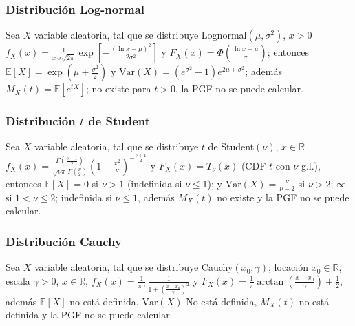 \subsubsection{Distribuci\'on Log-normal}

\begin{Def} Sea $X$ variable aleatoria, tal que se distribuye Lognormal$(\mu,\sigma^{2})$, $x>0$
$f_X(x) = \frac{1}{x\,\sigma\sqrt{2\pi}} \exp\!\left[-\frac{(\ln x-\mu)^{2}}{2\sigma^{2}}\right]$ y $F_X(x) = \Phi\!\left(\frac{\ln x-\mu}{\sigma}\right)$; entonces $\mathbb{E}[X] = \exp\!\left(\mu+\frac{\sigma^{2}}{2}\right)$ y $\mathrm{Var}(X) =\left(e^{\sigma^{2}}-1\right)e^{2\mu+\sigma^{2}}$; adem\'as $M_X(t) = \mathbb{E}[e^{tX}]$; no existe para $t>0$,  la PGF no se puede calcular.

\end{Def}

\subsubsection{Distribuci\'on $t$ de Student}

\begin{Def} Sea $X$ variable aleatoria, tal que se distribuye $t$ de Student$(\nu)$, $x \in \mathbb{R}$
$f_X(x) = \frac{\Gamma\!\left(\frac{\nu+1}{2}\right)}{\sqrt{\nu\pi}\,\Gamma\!\left(\frac{\nu}{2}\right)} \left(1+\frac{x^{2}}{\nu}\right)^{-\frac{\nu+1}{2}}$ y $F_X(x) = T_{\nu}(x)$ (CDF $t$ con  $\nu$ g.l.),  entonces $ \mathbb{E}[X] = 0$ si  $\nu>1$ (indefinida si  $\nu \leq 1$); y $\mathrm{Var}(X) = \frac{\nu}{\nu-2}$ si $\nu>2$; $\infty$ si $1<\nu\leq 2$; indefinida si $\nu\leq 1$, adem\'as $M_X(t)$ no existe y la  PGF no se puede calcular.

\end{Def}

\subsubsection{Distribuci\'on Cauchy}

\begin{Def} Sea $X$ variable aleatoria, tal que se distribuye Cauchy$(x_{0},\gamma)$; locaci\'on $ x_{0}\in\mathbb{R}$,  escala $\gamma>0$, $x \in \mathbb{R}$, $ f_X(x) = \frac{1}{\pi \gamma}\,\frac{1}{1+\left(\frac{x-x_{0}}{\gamma}\right)^{2}}$ y $F_X(x) = \frac{1}{\pi}\arctan\!\left(\frac{x-x_{0}}{\gamma}\right) + \frac{1}{2}$, adem\'as $\mathbb{E}[X]$ no est\'a definida,  $\mathrm{Var}(X)$ No est\'a definida,  $M_X(t)$ no est\'a definida y la PGF no se puede calcular.

\end{Def}



